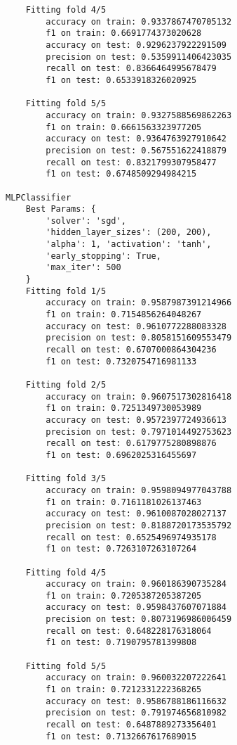 \begin{Verbatim}
	Fitting fold 4/5
		accuracy on train: 0.9337867470705132
		f1 on train: 0.6691774373020628
		accuracy on test: 0.9296237922291509
		precision on test: 0.5359911406423035
		recall on test: 0.8366464995678479
		f1 on test: 0.6533918326020925

	Fitting fold 5/5
		accuracy on train: 0.9327588569862263
		f1 on train: 0.6661563323977205
		accuracy on test: 0.9364763927910642
		precision on test: 0.567551622418879
		recall on test: 0.8321799307958477
		f1 on test: 0.6748509294984215

MLPClassifier
	Best Params: {
		'solver': 'sgd',
		'hidden_layer_sizes': (200, 200),
		'alpha': 1, 'activation': 'tanh',
		'early_stopping': True,
		'max_iter': 500
	}
	Fitting fold 1/5
		accuracy on train: 0.9587987391214966
		f1 on train: 0.7154856264048267
		accuracy on test: 0.9610772288083328
		precision on test: 0.8058151609553479
		recall on test: 0.6707000864304236
		f1 on test: 0.7320754716981133

	Fitting fold 2/5
		accuracy on train: 0.9607517302816418
		f1 on train: 0.7251349730053989
		accuracy on test: 0.9572397724936613
		precision on test: 0.7971014492753623
		recall on test: 0.6179775280898876
		f1 on test: 0.6962025316455697

	Fitting fold 3/5
		accuracy on train: 0.9598094977043788
		f1 on train: 0.7161181026137463
		accuracy on test: 0.9610087028027137
		precision on test: 0.8188720173535792
		recall on test: 0.6525496974935178
		f1 on test: 0.7263107263107264

	Fitting fold 4/5
		accuracy on train: 0.960186390735284
		f1 on train: 0.7205387205387205
		accuracy on test: 0.9598437607071884
		precision on test: 0.8073196986006459
		recall on test: 0.648228176318064
		f1 on test: 0.7190795781399808

	Fitting fold 5/5
		accuracy on train: 0.960032207222641
		f1 on train: 0.7212331222368265
		accuracy on test: 0.9586788186116632
		precision on test: 0.791974656810982
		recall on test: 0.6487889273356401
		f1 on test: 0.7132667617689015
\end{Verbatim}

